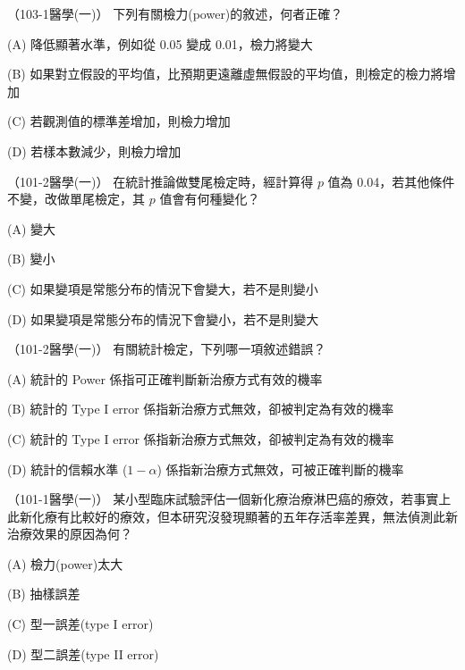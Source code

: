     \begin{docexam}{（103-1醫學(一)）}
        下列有關檢力(power)的敘述，何者正確？

        (A) 降低顯著水準，例如從 0.05 變成 0.01，檢力將變大

        (B) 如果對立假設的平均值，比預期更遠離虛無假設的平均值，則檢定的檢力將增加

        (C) 若觀測值的標準差增加，則檢力增加

        (D) 若樣本數減少，則檢力增加
    \end{docexam}
    
    \begin{docexam}{（101-2醫學(一)）}
        在統計推論做雙尾檢定時，經計算得 $p$ 值為 0.04，若其他條件不變，改做單尾檢定，其 $p$ 值會有何種變化？

        (A) 變大

        (B) 變小

        (C) 如果變項是常態分布的情況下會變大，若不是則變小

        (D) 如果變項是常態分布的情況下會變小，若不是則變大
    \end{docexam}
    
    \begin{docexam}{（101-2醫學(一)）}
        有關統計檢定，下列哪一項敘述錯誤？

        (A) 統計的 Power 係指可正確判斷新治療方式有效的機率

        (B) 統計的 Type I error 係指新治療方式無效，卻被判定為有效的機率

        (C) 統計的 Type I error 係指新治療方式無效，卻被判定為有效的機率

        (D) 統計的信賴水準 ($1-\alpha$) 係指新治療方式無效，可被正確判斷的機率
    \end{docexam}
    
    \begin{docexam}{（101-1醫學(一)）}
        某小型臨床試驗評估一個新化療治療淋巴癌的療效，若事實上此新化療有比較好的療效，但本研究沒發現顯著的五年存活率差異，無法偵測此新治療效果的原因為何？

        (A) 檢力(power)太大

        (B) 抽樣誤差

        (C) 型一誤差(type I error)

        (D) 型二誤差(type II error)
    \end{docexam}
    

